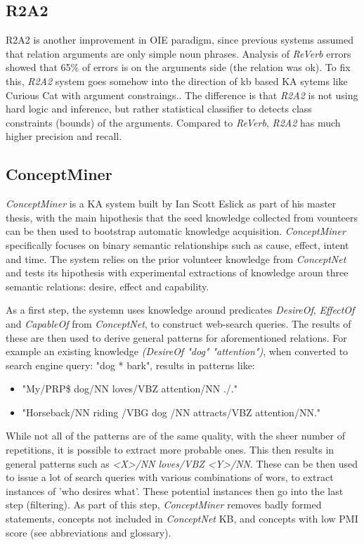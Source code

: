 \subsection{R2A2}
\label{section:rw_R2A2}
R2A2 is another improvement in OIE paradigm, since previous systems assumed that
relation arguments are only simple noun phrases. Analysis of \emph{ReVerb}
errors showed that 65\% of errors is on the arguments side (the relation was ok).
To fix this, \emph{R2A2} system goes somehow into the direction of kb based
KA sytems like Curious Cat with argument constraings.\parencite{Etzioni2011}. 
The difference is that 
\emph{R2A2} is not using hard logic and inference, but rather statistical
classifier to detects class constraints (bounds) of the arguments. Compared to
\emph{ReVerb}, \emph{R2A2} has much higher precision and recall.

\subsection{ConceptMiner}
\label{section:rw_ConceptMiner}
\emph{ConceptMiner} is a KA system built by Ian Scott Eslick as part of his
master thesis\parencite{Eslick2006}, with the main hipothesis that the seed
knowledge collected from vounteers can be then used to bootstrap automatic 
knowledge acquisition. \emph{ConceptMiner} specifically focuses on binary
semantic relationships such as cause, effect, intent and time. The system relies
on the prior volunteer knowledge from \emph{ConceptNet} and tests its 
hipothesis with experimental extractions of knowledge aroun three semantic
relations: desire, effect and capability.

As a first step, the systemn uses knowledge around predicates \emph{DesireOf},
\emph{EffectOf} and \emph{CapableOf} from \emph{ConceptNet}, to construct 
web-search queries. The results of these are then used to derive general
patterns for aforementioned relations. For example an existing knowledge
\emph{(DesireOf "dog" "attention")}, when converted to search engine query:
"dog * bark", results in  patterns like:
\begin{itemize}
	\item "My/PRP\$ dog/NN loves/VBZ attention/NN ./."
	\item "Horseback/NN riding /VBG dog /NN attracts/VBZ attention/NN."
\end{itemize}

While not all of the patterns are of the same quality, with the sheer number of
repetitions, it is possible to extract more probable ones. This then results
in general patterns such as \emph{<X>/NN loves/VBZ <Y>/NN}. These can be then
used to issue a lot of search queries with various combinations of wors, to 
extract instances of 'who desires what'. These potential instances then go
into the last step (filtering). As part of this step, \emph{ConceptMiner} 
removes badly formed statements, concepts not included in \emph{ConceptNet} KB,
and concepts with low PMI score (see abbreviations and glossary).

